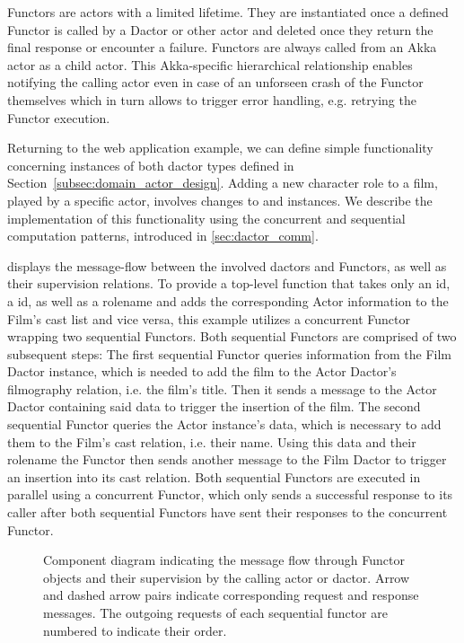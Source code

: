 Functors are actors with a limited lifetime.
They are instantiated once a defined Functor is called by a Dactor or other actor and deleted once they return the final response or encounter a failure.
Functors are always called from an Akka actor as a child actor.
This Akka-specific hierarchical relationship enables notifying the calling actor even in case of an unforseen crash of the Functor themselves which in turn allows to trigger error handling, e.g. retrying the Functor execution.

Returning to the web application example, we can define simple functionality concerning instances of both \gls{dactor} types defined in Section~\ref{subsec:domain_actor_design}.
Adding a new character role to a film, played by a specific actor, involves changes to  and  instances.
We describe the implementation of this functionality using the concurrent and sequential computation patterns, introduced in \cref{sec:dactor_comm}.

 displays the message-flow between the involved \glspl{dactor} and Functors, as well as their supervision relations.
To provide a top-level function that takes only an  id, a  id, as well as a rolename and adds the corresponding Actor information to the Film's cast list and vice versa, this example utilizes a concurrent Functor wrapping two sequential Functors.
Both sequential Functors are comprised of two subsequent steps:
The first sequential Functor queries information from the Film Dactor instance, which is needed to add the film to the Actor Dactor's filmography \gls{relation}, i.e. the film's title.
Then it sends a message to the Actor Dactor containing said data to trigger the insertion of the film.
The second sequential Functor queries the Actor instance's data, which is necessary to add them to the Film's cast \gls{relation}, i.e. their name.
Using this data and their rolename the Functor then sends another message to the Film Dactor to trigger an insertion into its cast \gls{relation}.
Both sequential Functors are executed in parallel using a concurrent Functor, which only sends a successful response to its caller after both sequential Functors have sent their responses to the concurrent Functor.

\begin{figure}[t]
  \centering
  
  \caption{Component diagram indicating the message flow through Functor objects and their supervision by the calling actor or \gls{dactor}. Arrow and dashed arrow pairs indicate corresponding request and response messages. The outgoing requests of each sequential functor are numbered to indicate their order.}
  \label{fig:functor_diagram}
\end{figure}


